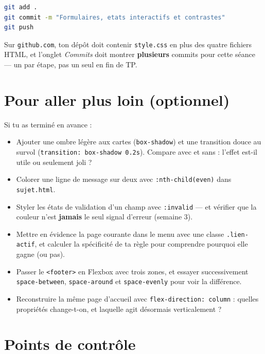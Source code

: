 \documentclass[a4paper,11pt]{article}
\begin{document}
\begin{lstlisting}[language=bash, numbers=none]
git add .
git commit -m "Formulaires, etats interactifs et contrastes"
git push
\end{lstlisting}

\begin{tcolorbox}[astuce, title={Vérifier que c'est bien parti}]
Sur \texttt{github.com}, ton dépôt doit contenir \texttt{style.css} en plus des quatre fichiers HTML, et l'onglet \textit{Commits} doit montrer \textbf{plusieurs} commits pour cette séance --- un par étape, pas un seul en fin de TP.
\end{tcolorbox}

\section{Pour aller plus loin (optionnel)}

Si tu as terminé en avance :

\begin{itemize}
  \item Ajouter une ombre légère aux cartes (\texttt{box-shadow}) et une transition douce au survol (\texttt{transition: box-shadow 0.2s}). Compare avec et sans : l'effet est-il utile ou seulement joli ?
  \item Colorer une ligne de message sur deux avec \texttt{:nth-child(even)} dans \texttt{sujet.html}.
  \item Styler les états de validation d'un champ avec \texttt{:invalid} --- et vérifier que la couleur n'est \textbf{jamais} le seul signal d'erreur (semaine 3).
  \item Mettre en évidence la page courante dans le menu avec une classe \texttt{.lien-actif}, et calculer la spécificité de ta règle pour comprendre pourquoi elle gagne (ou pas).
  \item Passer le \texttt{<footer>} en Flexbox avec trois zones, et essayer successivement \texttt{space-between}, \texttt{space-around} et \texttt{space-evenly} pour voir la différence.
  \item Reconstruire la même page d'accueil avec \texttt{flex-direction: column} : quelles propriétés change-t-on, et laquelle agit désormais verticalement ?
\end{itemize}

\section{Points de contrôle}
\end{document}
